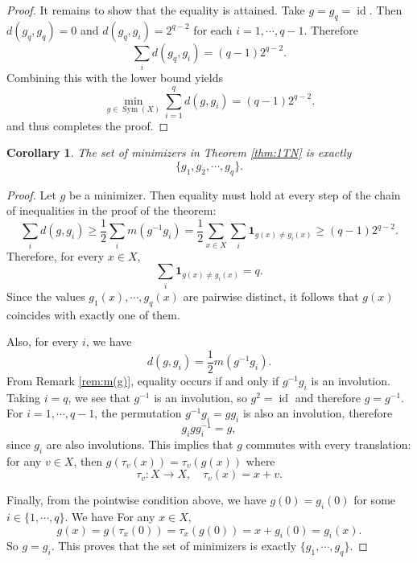 \documentclass[11pt,oneside,letterpaper]{article}
\numberwithin{equation}{section}
\newtheorem{corollary}[theorem]{Corollary}
\theoremstyle{definition}
\theoremstyle{remark}
\DeclareMathOperator{\id}{id}
\DeclareMathOperator{\Sym}{Sym}
\begin{document}
\begin{proof}
  It remains to show that the equality is attained. Take $g=g_q=\id$.
  Then $d(g_q,g_q)=0$ and $d(g_q,g_i)=2^{q-2}$ for each $i=1,\cdots,q-1$. Therefore
  \begin{equation}
    \sum_i d(g_q,g_i) = (q-1)2^{q-2}.
  \end{equation}
  Combining this with the lower bound yields
  \begin{equation}
    \min_{g\in \Sym(X)} \sum_{i=1}^q d(g,g_i) = (q-1)2^{q-2}.
  \end{equation}
   and thus completes the proof.
\end{proof}

\begin{corollary}
  The set of minimizers in Theorem \ref{thm:1TN} is exactly
  \begin{equation}
    \{g_1,g_2,\cdots,g_q\}.
  \end{equation}
\end{corollary}
\begin{proof}
  Let $g$ be a minimizer. Then equality must hold at every step of the chain of inequalities in the proof of the theorem:
  \begin{equation}
    \sum_i d(g,g_i)\ge \frac{1}{2}\sum_i m(g^{-1}g_i) = \frac{1}{2}\sum_{x\in X}\sum_i \mathbf{1}_{g(x)\ne g_i(x)} \ge (q-1)2^{q-2}.
  \end{equation}
  Therefore, for every $x\in X$,
  \begin{equation}
    \sum_i \mathbf{1}_{g(x)\ne g_i(x)} = q.
  \end{equation}
  Since the values $g_1(x),\cdots,g_q(x)$ are pairwise distinct, it follows that $g(x)$ coincides with exactly one of them.

  Also, for every $i$, we have
  \begin{equation}
    d(g,g_i) = \frac{1}{2}m(g^{-1}g_i).
  \end{equation}
  From Remark \ref{rem:m(g)}, equality occurs if and only if $g^{-1}g_i$ is an involution. Taking $i=q$, we see that $g^{-1}$ is an involution, so $g^2=\id$ and therefore $g=g^{-1}$. For $i=1,\cdots,q-1$, the permutation $g^{-1}g_i=gg_i$ is also an involution, therefore
  \begin{equation}
    g_i g g_i^{-1} = g,
  \end{equation}
  since $g_i$ are also involutions. This implies that $g$ commutes with every translation: for any $v\in X$, then $g(\tau_v(x))=\tau_v(g(x))$ where
  \begin{equation}
    \tau_v: X\to X, \quad \tau_v(x) = x+v.
  \end{equation}

  Finally, from the pointwise condition above, we have $g(0)=g_i(0)$ for some $i\in\{1,\cdots,q\}$. We have
 For any $x\in X$,
  \begin{equation}
    g(x) = g(\tau_x(0)) = \tau_x(g(0)) = x + g_i(0) = g_i(x).
  \end{equation}
  So $g=g_i$. This proves that the set of minimizers is exactly $\{g_1,\cdots,g_q\}$.
\end{proof}
\end{document}
